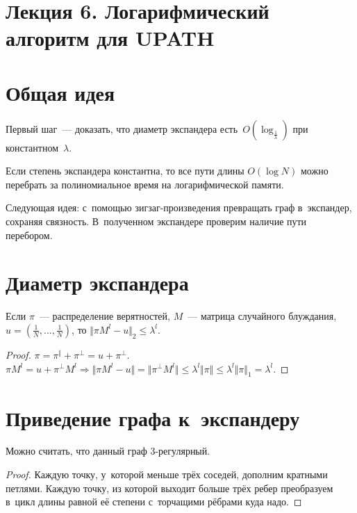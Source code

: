 \documentclass{article}
\begin{document}
\section*{Лекция 6. Логарифмический алгоритм для \textbf{UPATH}}
\resetcntrs

\section{Общая идея}

Первый шаг~--- доказать, что диаметр экспандера
есть~$O(\log_{\frac{1}{\lambda}})$ при константном~$\lambda$.

Если степень экспандера константна, то все пути длины $O(\log N)$ можно
перебрать за полиномиальное время на логарифмической памяти.

Следующая идея: с~помощью зигзаг-произведения превращать граф в~экспандер,
сохраняя связность. В~полученном экспандере проверим наличие пути перебором.

\section{Диаметр экспандера}

\begin{claim}
	Если $\pi$~--- распределение верятностей, $M$~--- матрица случайного
	блуждания, $u = (\frac{1}{N}, \ldots, \frac{1}{N})$, то $\Vert \pi M^l - u
	\Vert_2 \le \lambda^l$.
\end{claim}
\begin{proof}
	$\pi = \pi^\Vert + \pi^\bot = u + \pi^\bot$. $\pi M^l = u + \pi^\bot M^l
	\Rightarrow \Vert \pi M^l - u \Vert = \Vert \pi^\bot M^l \Vert \le \lambda^l
	\Vert \pi \Vert \le \lambda^l \Vert \pi \Vert_1 = \lambda^l$.
\end{proof}

\section{Приведение графа к~экспандеру}

\begin{claim}
	Можно считать, что данный граф 3-регулярный.
\end{claim}
\begin{proof}
	Каждую точку, у~которой меньше трёх соседей, дополним кратными петлями. Каждую
	точку, из которой выходит больше трёх ребер преобразуем в~цикл длины равной её
	степени с~торчащими рёбрами куда надо.
\end{proof}
\end{document}
